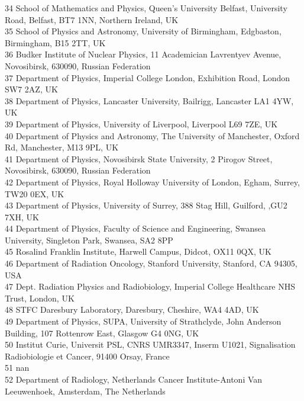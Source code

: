 {\begin{tabbing}
     34 \> School of Mathematics and Physics, Queen's University Belfast, University Road, Belfast, BT7 1NN, Northern Ireland, UK\\
     35 \> School of Physics and Astronomy, University of Birmingham, Edgbaston, Birmingham, B15 2TT, UK\\
     36 \> Budker Institute of Nuclear Physics, 11 Academician Lavrentyev Avenue, Novosibirsk, 630090, Russian Federation\\
     37 \> Department of Physics, Imperial College London, Exhibition Road, London SW7 2AZ, UK\\
     38 \> Department of Physics, Lancaster University, Bailrigg, Lancaster LA1 4YW, UK\\
     39 \> Department of Physics, University of Liverpool, Liverpool L69 7ZE, UK\\
     40 \> Department of Physics and Astronomy, The University of Manchester, Oxford Rd, Manchester, M13 9PL, UK\\
     41 \> Department of Physics, Novosibirsk State University, 2 Pirogov Street, Novosibirsk, 630090, Russian Federation\\
     42 \> Department of Physics, Royal Holloway University of London, Egham, Surrey, TW20 0EX, UK\\
     43 \> Department of Physics, University of Surrey, 388 Stag Hill, Guilford, ,GU2 7XH, UK\\
     44 \> Department of Physics, Faculty of Science and Engineering, Swansea University, Singleton Park, Swansea, SA2 8PP\\
     45 \> Rosalind Franklin Institute, Harwell Campus, Didcot, OX11 0QX, UK\\
     46 \> Department of Radiation Oncology, Stanford University, Stanford, CA 94305, USA\\
     47 \> Dept. Radiation Physics and Radiobiology, Imperial College Healthcare NHS Trust, London, UK\\
     48 \> STFC Daresbury Laboratory, Daresbury, Cheshire, WA4 4AD, UK\\
     49 \> Department of Physics, SUPA, University of Strathclyde, John Anderson Building, 107 Rottenrow East, Glasgow G4 0NG, UK\\
     50 \> Institut Curie, Universit PSL, CNRS UMR3347, Inserm U1021, Signalisation Radiobiologie et Cancer, 91400 Orsay, France\\
     51 \> nan\\
     52 \> Department of Radiology, Netherlands Cancer Institute-Antoni Van Leeuwenhoek, Amsterdam, The Netherlands\\
    ~   \> \\
  \end{tabbing}
}
